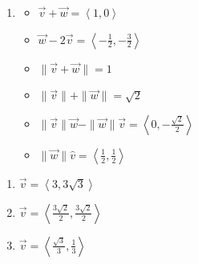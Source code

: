 \documentclass{ximera}
\begin{document}
\begin{enumerate}
\begin{itemize}
\item  $\overrightarrow{v} + \overrightarrow{w} = \left<3,2\right> $ 
\item  $\overrightarrow{w}  - 2\overrightarrow{v}  = \left<-6, -10 \right>$ 


\item $\| \overrightarrow{v} + \overrightarrow{w} \| = \sqrt{13}$ 
\item  $\| \overrightarrow{v} \| + \| \overrightarrow{w}\| = 7$ 


\item $\| \overrightarrow{v} \| \overrightarrow{w} - \| \overrightarrow{w} \| \overrightarrow{v}  = \left<-6,-18\right>$ 
\item $\|\overrightarrow{w}\| \hat{v}= \left<\frac{6}{5}, \frac{8}{5}\right>$ 

\end{itemize}

 

\item  

 

\begin{itemize}

\item  $\overrightarrow{v} + \overrightarrow{w} = \left<1,0\right> $ 
\item  $\overrightarrow{w}  - 2\overrightarrow{v}  = \left<-\frac{1}{2}, -\frac{3}{2} \right>$ 


\item $\| \overrightarrow{v} + \overrightarrow{w} \| = 1$ 
\item  $\| \overrightarrow{v} \| + \| \overrightarrow{w}\| = \sqrt{2}$ 

\item $\| \overrightarrow{v} \| \overrightarrow{w} - \| \overrightarrow{w} \| \overrightarrow{v}  = \left<0,-\frac{\sqrt{2}}{2}\right>$ 
\item $\|\overrightarrow{w}\| \hat{v}= \left<\frac{1}{2}, \frac{1}{2}\right>$ 

\end{itemize}



\setcounter{HW}{\value{enumi}}

\end{enumerate}

 

\begin{enumerate}

\setcounter{enumi}{\value{HW}}

\item $\overrightarrow{v} = \left<3,3\sqrt{3}\right>$
\item $\overrightarrow{v} = \left<\frac{3\sqrt{2}}{2},\frac{3\sqrt{2}}{2}\right>$
\item $\overrightarrow{v} = \left< \frac{\sqrt{3}}{3}, \frac{1}{3}\right>$

\setcounter{HW}{\value{enumi}}

\end{enumerate}
\end{document}
